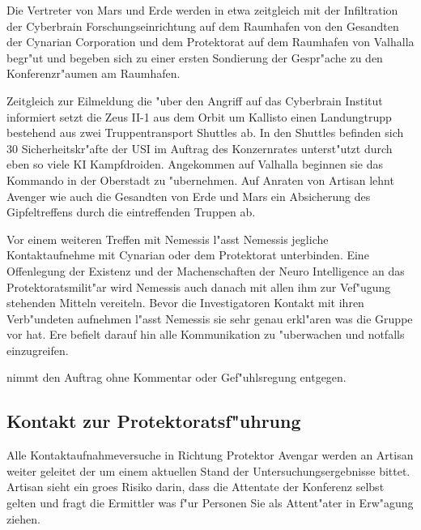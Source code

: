 Die Vertreter von Mars und Erde werden in etwa zeitgleich mit der Infiltration der Cyberbrain Forschungseinrichtung auf dem Raumhafen von den Gesandten der Cynarian Corporation und dem Protektorat auf dem Raumhafen von Valhalla begr"u\3t und begeben sich zu einer ersten Sondierung der Gespr"ache zu den Konferenzr"aumen am Raumhafen.


Zeitgleich zur Eilmeldung die "uber den Angriff auf das Cyberbrain Institut informiert setzt die Zeus II-1 aus dem Orbit um Kallisto einen Landungtrupp bestehend aus zwei Truppentransport Shuttles ab. In den Shuttles befinden sich 30 Sicherheitskr"afte der USI im Auftrag des Konzernrates unterst"utzt durch eben so viele KI Kampfdroiden. Angekommen auf Valhalla beginnen sie das Kommando in der Oberstadt zu "ubernehmen. Auf Anraten von Artisan lehnt Avenger wie auch die Gesandten von Erde und Mars ein Absicherung des Gipfeltreffens durch die eintreffenden Truppen ab.



Vor einem weiteren Treffen mit Nemessis l"asst Nemessis jegliche Kontaktaufnehme mit Cynarian oder dem Protektorat unterbinden. Eine Offenlegung der Existenz und der Machenschaften der Neuro Intelligence an das Protektoratsmilit"ar wird Nemessis auch danach mit allen ihm zur Vef"ugung stehenden Mitteln vereiteln. Bevor die Investigatoren Kontakt mit ihren Verb"undeten aufnehmen l"asst Nemessis sie sehr genau erkl"aren was die Gruppe vor hat. Ere befielt darauf hin \xl{} alle Kommunikation zu "uberwachen und notfalls einzugreifen.


\xl{} nimmt den Auftrag ohne Kommentar oder Gef"uhlsregung entgegen.

\subsection{Kontakt zur Protektoratsf"uhrung} 
Alle Kontaktaufnahmeversuche in Richtung Protektor Avengar werden an Artisan weiter geleitet der um einem aktuellen Stand der Untersuchungsergebnisse bittet. Artisan sieht ein gro\3es Risiko darin, dass die Attentate der Konferenz selbst gelten und fragt die Ermittler was f"ur Personen Sie als Attent"ater in Erw"agung ziehen.

